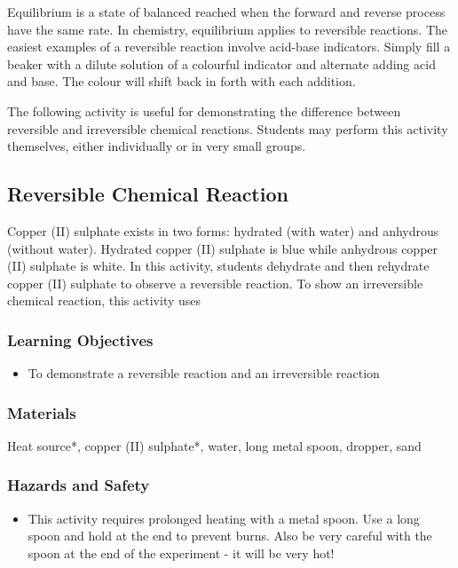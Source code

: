 Equilibrium is a state of balanced reached when the forward and reverse process have the same rate. In chemistry, equilibrium applies to reversible reactions. The easiest examples of a reversible reaction involve acid-base indicators. Simply fill a beaker with a dilute solution of a colourful indicator and alternate adding acid and base. The colour will shift back in forth with each addition.

The following activity is useful for demonstrating the difference between reversible and irreversible chemical reactions. Students may perform this activity themselves, either individually or in very small groups.

\subsection{Reversible Chemical Reaction}

Copper (II) sulphate exists in two forms: hydrated (with water) and anhydrous (without water). Hydrated copper (II) sulphate is blue while anhydrous copper (II) sulphate is white. In this activity, students dehydrate and then rehydrate copper (II) sulphate to observe a reversible reaction. To show an irreversible chemical reaction, this activity uses 

\subsubsection*{Learning Objectives}
\begin{itemize}
\item{To demonstrate a reversible reaction and an irreversible reaction}
\end{itemize}

\subsubsection*{Materials}
Heat source*, copper (II) sulphate*, water, long metal spoon, dropper, sand

\subsubsection*{Hazards and Safety}
\begin{itemize}
\item{This activity requires prolonged heating with a metal spoon. Use a long spoon and hold at the end to prevent burns. Also be very careful with the spoon at the end of the experiment - it will be very hot!}
\end{itemize}

